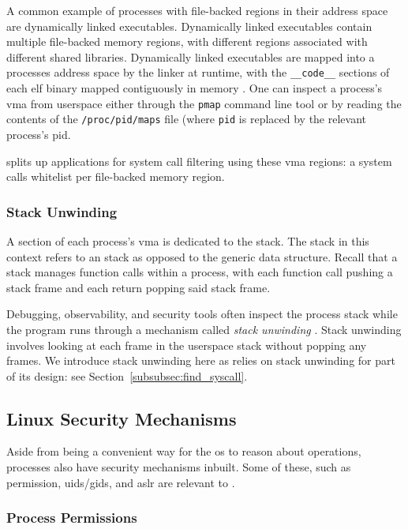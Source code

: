 A common example of processes with file-backed regions in their address space
are dynamically linked executables. Dynamically linked executables contain
multiple file-backed memory regions, with different regions associated
with different shared libraries. Dynamically linked executables are mapped
into a processes address space by the linker at runtime, with the
\texttt{\_\_code\_\_} sections of each \ac{elf} binary mapped contiguously 
in memory \cite{DYNAMIC_LINKERS_OS}. One can inspect a process's \ac{vma} from
userspace either through the \texttt{pmap} command line tool or by reading
the contents of the \texttt{/proc/pid/maps} file (where \texttt{pid} is
replaced by the relevant process's \ac{pid}. 

\af splits up applications for system call filtering using these \ac{vma} regions: a system calls
whitelist per file-backed memory region.

\subsubsection{Stack Unwinding}

A section of each process's \ac{vma} is dedicated to the stack. The stack in
this context refers to an  stack as opposed to the generic data
structure. Recall that a stack manages function calls within a
process, with each function call pushing a stack frame and each return popping
said stack frame.
 
Debugging, observability, and security tools often inspect the process stack
while the program runs through a mechanism called \textit{stack
unwinding} \cite{gregg2014linux, kilroy2022linker}. Stack unwinding involves looking at 
each frame in the userspace stack without popping any frames. We
introduce stack unwinding here as \af relies on stack unwinding for part of
its design: see Section~\ref{subsubsec:find_syscall}.

\subsection{Linux Security Mechanisms}

Aside from being a convenient way for the \ac{os} to reason about
operations, processes also have security mechanisms inbuilt. Some of these, such as
permission, \acp{uid}/\acp{gid}, and \ac{aslr} are relevant to \af.

\subsubsection{Process Permissions}

